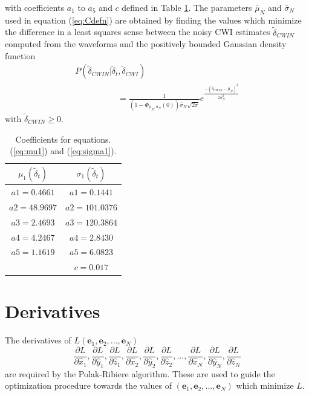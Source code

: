 \documentclass[extra]{gji}
\begin{document}
with coefficients $a_1$ to $a_5$ and $c$ defined in Table
\ref{tab-const4-mu1-sigma1}. The parameters $\bar{\mu}_N$ and
$\bar{\sigma}_N$ used in equation (\ref{eq:Cdefn}) are obtained by
finding the values which minimize the difference in a least squares
sense between the noisy CWI estimates $\widetilde{\delta}_{CWIN}$
computed from the waveforms and the positively bounded Gaussian
density function
\begin{equation}
\label{eq-likelihood-noisydata-pdf-orig}
\begin{array}{l}
P(\widetilde{\delta}_{CWIN}|\widetilde{\delta}_t,\widetilde{\delta}_{CWI}) \\
\hspace{5em} = \frac{1}{\left(1-\Phi_{\bar{\mu}_N,\bar{\sigma}_N}(0)\right)\bar{\sigma}_N\sqrt{2\pi}}
e^{  \frac{-(\widetilde{\delta}_{CWIN}-\bar{\mu}_N)^2}{2\bar{\sigma}_N^2}  }
\end{array}
\end{equation}
with $\widetilde{\delta}_{CWIN} \geq 0$.


\begin{table}
\caption{Coefficients for equations. (\ref{eq:mu1}) and
(\ref{eq:sigma1}).} \label{tab-const4-mu1-sigma1}
\begin{tabular}{|c|c|}
\hline
$\mu_1(\widetilde{\delta}_t)$ & $\sigma_1(\widetilde{\delta}_t)$ \\
\hline
$a1 = 0.4661$ & $a1 = 0.1441$\\
$a2 = 48.9697$ & $a2 = 101.0376$\\
$a3 = 2.4693$ & $a3 = 120.3864$\\
$a4 = 4.2467$ & $a4 = 2.8430$\\
$a5 = 1.1619$ & $a5 = 6.0823$ \\
     & $c = 0.017$ \\
\hline
\end{tabular}
\end{table}


\section{Derivatives}
\label{sec-Appendix-derivatives_ofL}

The derivatives of $L(\mathbf{e}_1,\mathbf{e}_2,...,\mathbf{e}_N)$
\begin{equation}
\frac{\partial L}{\partial \hat{x}_1},
\frac{\partial L}{\partial \hat{y}_1},
 \frac{\partial L}{\partial \hat{z}_1},
\frac{\partial L}{\partial \hat{x}_2},
\frac{\partial L}{\partial \hat{y}_2},
\frac{\partial L}{\partial \hat{z}_2},
...,
\frac{\partial L}{\partial \hat{x}_N},
\frac{\partial L}{\partial \hat{y}_N},
\frac{\partial L}{\partial \hat{z}_N}
\end{equation}
are required by the Polak-Ribiere algorithm. These are used to guide
the optimization procedure towards the values of
$(\mathbf{e}_1,\mathbf{e}_2,...,\mathbf{e}_N)$ which minimize $L$.
\end{document}
